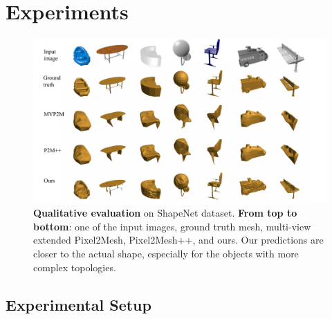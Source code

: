 \section{Experiments}

\begin{figure}[t]
\begin{center}
\includegraphics[width=\linewidth]{imgs/qualitative_evaluation.pdf}
\end{center}
\vspace{-4mm}
\caption{
    \textbf{Qualitative evaluation} on ShapeNet dataset. \textbf{From top to bottom}: one of the input images, ground truth mesh, multi-view extended Pixel2Mesh, Pixel2Mesh++, and ours.
    Our predictions are closer to the actual shape, especially for the objects with more complex topologies.}

\vspace{-4mm}
\label{fig:qualitative_evaluation}
\end{figure}

\subsection{Experimental Setup}
\label{subsec:experimental_setup}

